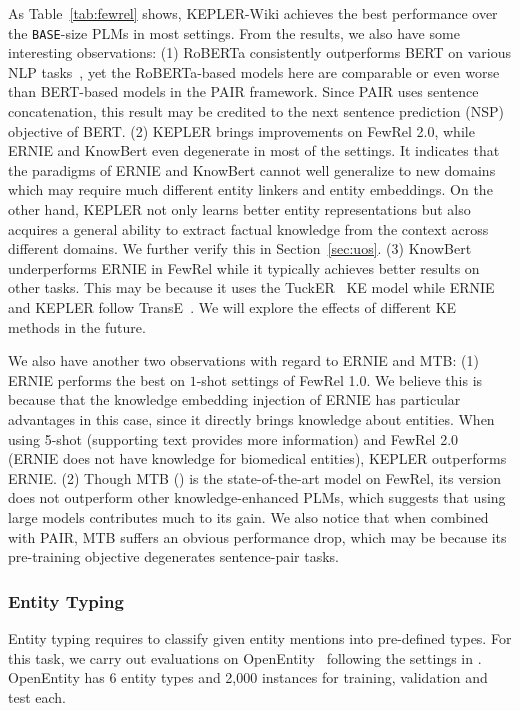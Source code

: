 As Table~\ref{tab:fewrel} shows, KEPLER-Wiki achieves the best performance over the \texttt{BASE}-size PLMs in most settings. From the results, we also have some interesting observations: 
(1) RoBERTa consistently outperforms BERT on various NLP tasks~\citep{liu2019roberta}, yet the RoBERTa-based models here are comparable or even worse than BERT-based models in the PAIR framework. Since PAIR uses sentence concatenation, this result may be credited to the next sentence prediction (NSP) objective of BERT. (2) KEPLER brings improvements on FewRel 2.0, while ERNIE and KnowBert even degenerate in most of the settings. It indicates that the paradigms of ERNIE and KnowBert cannot well generalize to new domains which may require much different entity linkers and entity embeddings. On the other hand, KEPLER not only learns better entity representations but also acquires a general ability to extract factual knowledge from the context across different domains. We further verify this in Section~\ref{sec:uos}. 
(3) KnowBert underperforms ERNIE in FewRel while it typically achieves better results on other tasks. This may be because it uses the TuckER~\citep{balazevic-etal-2019-tucker} KE model while ERNIE and KEPLER follow TransE~\citep{bordes2013translating}. We will explore the effects of different KE methods in the future. 

We also have another two observations with regard to ERNIE and MTB: (1) ERNIE performs the best on $1$-shot settings of FewRel 1.0. We believe this is because that the knowledge embedding injection of ERNIE has particular advantages in this case, since it directly brings knowledge about entities. When using 5-shot (supporting text provides more information) and FewRel 2.0 (ERNIE does not have knowledge for biomedical entities), KEPLER outperforms ERNIE. (2) Though MTB (\BERTLARGE) is the state-of-the-art model on FewRel, its \BERTBASE version does not outperform other knowledge-enhanced PLMs, which suggests that using large models contributes much to its gain. We also notice that when combined with PAIR, MTB suffers an obvious performance drop, which may be because its pre-training objective degenerates sentence-pair tasks.

\subsubsection*{Entity Typing}

Entity typing requires to classify given entity mentions into pre-defined types. For this task, we carry out evaluations on OpenEntity~\citep{choi-etal-2018-ultra} following the settings in \citet{zhang-etal-2019-ernie}. OpenEntity has 6 entity types and 2,000 instances for training, validation and test each.

